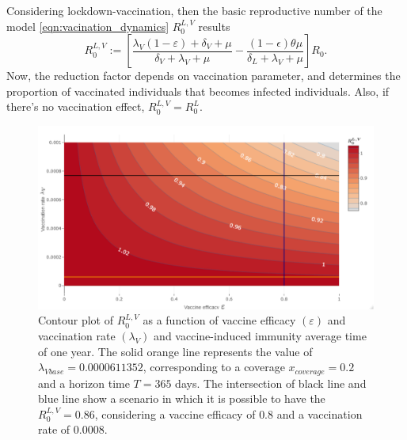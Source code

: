     Considering lockdown-vaccination, then the basic
reproductive number of the model \eqref{eqn:vacination_dynamics}  $R_{0}^{L,V}$
results
%
\begin{equation*}\label{eqn:reproductive_numberLV}
    R_{0}^{L, V} :=
        \left[
            \frac{
                \lambda_V (1 - \varepsilon) + \delta_V + \mu
            }{
                \delta_V + \lambda_V +
                \mu
           }
        - \frac{
            (1 - \epsilon) \theta \mu
        }{
            \delta_L + \lambda_V + \mu
        }
        \right] R_0.
\end{equation*}
%
    Now, the reduction factor depends on vaccination parameter, and determines
the proportion of vaccinated individuals that becomes infected individuals.
Also, if there’s no vaccination effect,
$
    R_{0}^{L,V} = R_{0}^{L}
$.
%
\begin{figure}[tbh]
    \centering
    \includegraphics[scale=0.64,keepaspectratio]{./Figures/Rlv_contour.pdf}
    \caption{
        Contour plot of $R_0^{L,V}$ as a function of vaccine efficacy $(
        \varepsilon) $ and vaccination rate $(\lambda_V)$ and vaccine-induced
        immunity average time of one year. The solid orange line represents the
         value of $\lambda_{Vbase}=\num{0.0000611352}$,
        corresponding to a coverage $x_{coverage} = \num{0.2}$ and a horizon
        time $T=\num{365}$ days. The intersection of black line and blue line
        show a scenario in which it is possible to have the $R^{L, V}_0=0.86$,
        considering a vaccine efficacy of $\num{0.8}$ and a vaccination rate of
        $\num{0.0008}$.}
    \label{fig:rvcontour1}
\end{figure}

